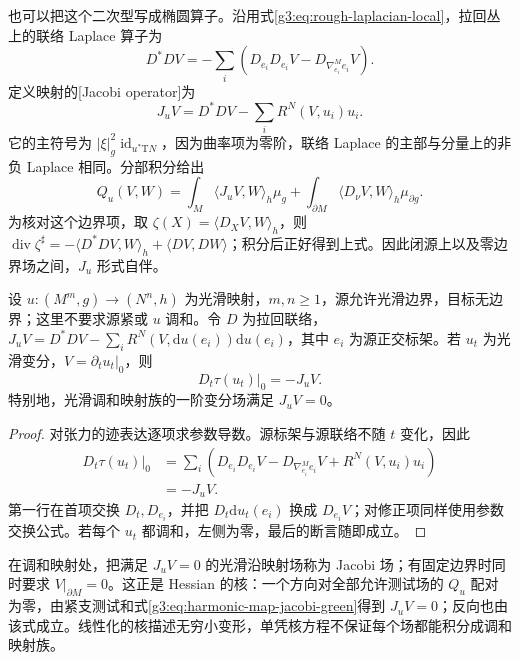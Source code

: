 也可以把这个二次型写成椭圆算子。沿用式\eqref{g3:eq:rough-laplacian-local}，拉回丛上的联络 Laplace 算子为
\[
	D^*D V=-\sum_i\left(D_{e_i}D_{e_i}V-D_{\nabla^M_{e_i}e_i}V\right).
\]
定义映射的[Jacobi operator]为
\begin{equation}\label{g3:eq:harmonic-map-jacobi-operator}
	J_uV=D^*DV-\sum_iR^N(V,u_i)u_i.
\end{equation}
它的主符号为 \(|\xi|_g^2\operatorname{id}_{u^*\mathrm TN}\)，因为曲率项为零阶，联络 Laplace 的主部与分量上的非负 Laplace 相同。分部积分给出
\begin{equation}\label{g3:eq:harmonic-map-jacobi-green}
	Q_u(V,W)=\int_M\langle J_uV,W\rangle_h\mu_g
	+\int_{\partial M}\langle D_\nu V,W\rangle_h\mu_{\partial g}.
\end{equation}
为核对这个边界项，取 \(\zeta(X)=\langle D_XV,W\rangle_h\)，则
\(\operatorname{div}\zeta^\sharp=-\langle D^*DV,W\rangle_h+\langle DV,DW\rangle\)；积分后正好得到上式。因此闭源上以及零边界场之间，\(J_u\) 形式自伴。

\begin{proposition}\label{g3:prop:harmonic-map-jacobi-linearization}
	设 \(u:(M^m,g)\to(N^n,h)\) 为光滑映射，\(m,n\ge1\)，源允许光滑边界，目标无边界；这里不要求源紧或 \(u\) 调和。令 \(D\) 为拉回联络，\(J_uV=D^*DV-\sum_iR^N(V,\mathrm du(e_i))\mathrm du(e_i)\)，其中 \(e_i\) 为源正交标架。若 \(u_t\) 为光滑变分，\(V=\partial_tu_t|_0\)，则
	\begin{equation}\label{g3:eq:tension-linearization}
		\left.D_t\tau(u_t)\right|_0=-J_uV.
	\end{equation}
	特别地，光滑调和映射族的一阶变分场满足 \(J_uV=0\)。
\end{proposition}
\begin{proof}
	对张力的迹表达逐项求参数导数。源标架与源联络不随 \(t\) 变化，因此
	\[
		\begin{aligned}
			D_t\tau(u_t)|_0
			&=\sum_i\left(D_{e_i}D_{e_i}V-D_{\nabla^M_{e_i}e_i}V
			+R^N(V,u_i)u_i\right)\\
			&=-J_uV.
		\end{aligned}
	\]
	第一行在首项交换 \(D_t,D_{e_i}\)，并把 \(D_t\mathrm du_t(e_i)\) 换成 \(D_{e_i}V\)；对修正项同样使用参数交换公式。若每个 \(u_t\) 都调和，左侧为零，最后的断言随即成立。
\end{proof}

在调和映射处，把满足 \(J_uV=0\) 的光滑沿映射场称为 Jacobi 场；有固定边界时同时要求 \(V|_{\partial M}=0\)。这正是 Hessian 的核：一个方向对全部允许测试场的 \(Q_u\) 配对为零，由紧支测试和式\eqref{g3:eq:harmonic-map-jacobi-green}得到 \(J_uV=0\)；反向也由该式成立。线性化的核描述无穷小变形，单凭核方程不保证每个场都能积分成调和映射族。


